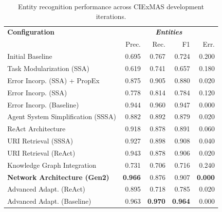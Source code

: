 \documentclass[a4paper,oneside,bibliography=totoc]{scrbook}
\begin{document}
\begin{table}[h]
  \centering
  \begin{tabular}{p{6cm}|rrrr}
    \toprule
    \textbf{Configuration}               & \multicolumn{4}{c}{\textit{\textbf{Entities}}}                                                    \\
                                         & Prec.                                          & Rec.           & F1             & Err.           \\
    \midrule
    Initial Baseline                     & 0.695                                          & 0.767          & 0.724          & 0.200          \\
    Task Modularization (SSA)            & 0.619                                          & 0.741          & 0.657          & 0.180          \\
    Error Incorp. (SSA) + PropEx         & 0.875                                          & 0.905          & 0.880          & 0.020          \\
    Error Incorp. (SSA)                  & 0.778                                          & 0.814          & 0.784          & 0.120          \\
    Error Incorp. (Baseline)             & 0.944                                          & 0.960          & 0.947          & 0.000          \\
    Agent System Simplification (SSSA)   & 0.882                                          & 0.892          & 0.879          & 0.020          \\
    ReAct Architecture                   & 0.918                                          & 0.878          & 0.891          & 0.060          \\
    URI Retrieval (SSSA)                 & 0.927                                          & 0.898          & 0.908          & 0.040          \\
    URI Retrieval (ReAct)                & 0.943                                          & 0.878          & 0.906          & 0.020          \\
    Knowledge Graph Integration          & 0.731                                          & 0.706          & 0.716          & 0.240          \\
    \textbf{Network Architecture (Gen2)} & \textbf{0.966}                                 & 0.876          & 0.907          & \textbf{0.000} \\
    Advanced Adapt. (ReAct)              & 0.895                                          & 0.718          & 0.785          & 0.020          \\
    Advanced Adapt. (Baseline)           & 0.963                                          & \textbf{0.970} & \textbf{0.964} & 0.000          \\
    \bottomrule
  \end{tabular}
  \caption{Entity recognition performance across CIExMAS development iterations.}
  \label{tab:evaluation_entities_iterations}
\end{table}
\end{document}
